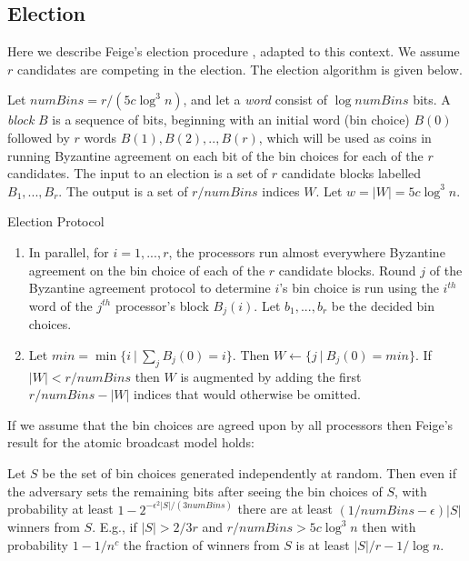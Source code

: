 \documentclass{sig-alternate}
\begin{document}
\subsection{Election}\label{election}
Here we describe Feige's election procedure \cite{Feige}, adapted to this context.  We assume $r$ candidates are competing in the election.  The election algorithm is given below.

\begin{definition}
Let $numBins = r/ (5c \log^3 n)$, and let a \emph{word} consist of $\log numBins$ bits.  A {\it block} $B$ is a sequence of bits, beginning with an initial word (bin choice) $B(0)$ followed by $r$ words $B(1), B(2),..,B(r) $, which will be used as coins in running Byzantine agreement on each bit of the bin choices for each of the $r$ candidates.  The input to an election is a set of $r$ candidate blocks labelled $B_1,...,B_r$. The output is 
a set of $r/numBins$ indices $W$.  Let $w=|W|=5c \log^3 n$.
  
 \end{definition}

\begin{algorithm}\label{a:ep}
\caption{Election Protocol}
\begin{enumerate}
\item In parallel, for $i=1,...,r$, the processors run almost everywhere Byzantine agreement on the bin choice of each of the $r$ candidate blocks.  Round  $j$ of the Byzantine agreement protocol to determine  $i$'s bin choice  is run  using the $i^{th}$ word of the  $j^{th}$ processor's block $B_j(i)$.   Let $b_1,...,b_r$ be the decided bin choices.
\item
Let  $min  =\min\{i  ~|~  \sum_j B_j(0)=i \}$. Then   $W \leftarrow \{j~|~ B_j(0)=min\}$.
If $|W| < r/numBins$ then $W$ is augmented by adding the first  $r/numBins -|W|$ indices that would otherwise be omitted. 
\end{enumerate} 
\end{algorithm}

If we assume that the bin choices are agreed upon by all processors then Feige's result for the atomic broadcast model holds:

\begin{lemma} \cite{Feige} \label{Feige}
Let $S$ be the set of bin choices generated independently at random. Then even if the adversary sets the remaining bits after seeing the bin choices of $S$, with probability at least $1- 2^{- \epsilon^2 |S|/(3 numBins )}$  there are at least $(1/numBins - \epsilon)|S| $   winners from $S$.  E.g., if  $|S| > 2/3 r$ and
$r/numBins > 5c \log^3  n$  then with probability $1-1/n^c$ the fraction of winners from $S$ is at least $|S|/r  - 1/\log  n$. 
\end{lemma}
\end{document}
